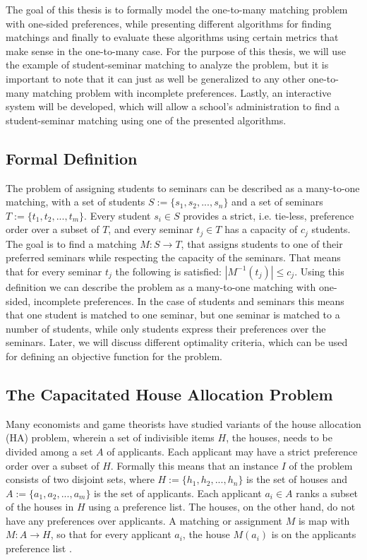 The goal of this thesis is to formally model the one-to-many matching problem with one-sided preferences, while presenting different algorithms for finding matchings and finally to evaluate these algorithms using certain metrics that make sense in the one-to-many case. For the purpose of this thesis, we will use the example of student-seminar matching to analyze the problem, but it is important to note that it can just as well be generalized to any other one-to-many matching problem with incomplete preferences. Lastly, an interactive system will be developed, which will allow a school's administration to find a student-seminar matching using one of the presented algorithms. 

\subsection{Formal Definition}
The problem of assigning students to seminars can be described as a many-to-one matching, with a set of students $S:= \{s_1, s_2, ...,s_n\}$ and a set of seminars $T:= \{t_1, t_2, ..., t_m\}$. Every student $s_i \in S$ provides a strict, i.e. tie-less, preference order over a subset of $T$, and every seminar $t_j \in T$ has a capacity of $c_j$ students. The goal is to find a matching $M: S \rightarrow T$, that assigns students to one of their preferred seminars while respecting the capacity of the seminars. That means that for every seminar $t_j$ the following is satisfied: $|M^{-1}(t_j)| \leq c_j$. Using this definition we can describe the problem as a many-to-one matching with one-sided, incomplete preferences. In the case of students and seminars this means that one student is matched to one seminar, but one seminar is matched to a number of students, while only students express their preferences over the seminars. Later, we will discuss different optimality criteria, which can be used for defining an objective function for the problem.

\subsection{The Capacitated House Allocation Problem}\label{intro:cha}
Many economists and game theorists \cite{FEKETE2003219} have studied variants of the house allocation (HA) problem, wherein a set of indivisible items $H$, the houses, needs to be divided among a set $A$ of applicants. Each applicant may have a strict preference order over a subset of $H$. Formally this means that an instance $I$ of the problem consists of two disjoint sets, where $H := \{h_1, h_2, ..., h_n\}$ is the set of houses and $A := \{a_1, a_2, ..., a_m\}$ is the set of applicants. Each applicant $a_i \in A$ ranks a subset of the houses in $H$ using a preference list. The houses, on the other hand, do not have any preferences over applicants. A matching or assignment $M$ is map with $M: A \rightarrow H$, so that for every applicant $a_i$, the house $M(a_i)$ is on the applicants preference list \cite{SngThesis}. 

